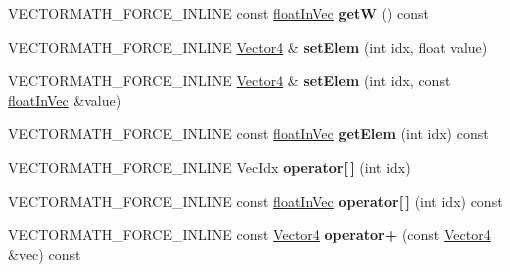 \begin{DoxyCompactItemize}
\item 
\mbox{\label{classVectormath_1_1Aos_1_1Vector4_a7f63ff20e6a8125b23090f3e9bd502bb}} 
V\+E\+C\+T\+O\+R\+M\+A\+T\+H\+\_\+\+F\+O\+R\+C\+E\+\_\+\+I\+N\+L\+I\+NE const \hyperlink{classVectormath_1_1floatInVec}{float\+In\+Vec} {\bfseries getW} () const
\item 
\mbox{\label{classVectormath_1_1Aos_1_1Vector4_adb13ca4795d04c6badc13e625265ca1b}} 
V\+E\+C\+T\+O\+R\+M\+A\+T\+H\+\_\+\+F\+O\+R\+C\+E\+\_\+\+I\+N\+L\+I\+NE \hyperlink{classVectormath_1_1Aos_1_1Vector4}{Vector4} \& {\bfseries set\+Elem} (int idx, float value)
\item 
\mbox{\label{classVectormath_1_1Aos_1_1Vector4_aa47ec459f23f48a9cadbfbc5cfdf879d}} 
V\+E\+C\+T\+O\+R\+M\+A\+T\+H\+\_\+\+F\+O\+R\+C\+E\+\_\+\+I\+N\+L\+I\+NE \hyperlink{classVectormath_1_1Aos_1_1Vector4}{Vector4} \& {\bfseries set\+Elem} (int idx, const \hyperlink{classVectormath_1_1floatInVec}{float\+In\+Vec} \&value)
\item 
\mbox{\label{classVectormath_1_1Aos_1_1Vector4_a2b57b84ded5d12fb7531973bb1a88abc}} 
V\+E\+C\+T\+O\+R\+M\+A\+T\+H\+\_\+\+F\+O\+R\+C\+E\+\_\+\+I\+N\+L\+I\+NE const \hyperlink{classVectormath_1_1floatInVec}{float\+In\+Vec} {\bfseries get\+Elem} (int idx) const
\item 
\mbox{\label{classVectormath_1_1Aos_1_1Vector4_af17b2f536750a2cbbef96c855ef43eda}} 
V\+E\+C\+T\+O\+R\+M\+A\+T\+H\+\_\+\+F\+O\+R\+C\+E\+\_\+\+I\+N\+L\+I\+NE Vec\+Idx {\bfseries operator\mbox{[}$\,$\mbox{]}} (int idx)
\item 
\mbox{\label{classVectormath_1_1Aos_1_1Vector4_a19518806cfe69127b9abcf71c02610b0}} 
V\+E\+C\+T\+O\+R\+M\+A\+T\+H\+\_\+\+F\+O\+R\+C\+E\+\_\+\+I\+N\+L\+I\+NE const \hyperlink{classVectormath_1_1floatInVec}{float\+In\+Vec} {\bfseries operator\mbox{[}$\,$\mbox{]}} (int idx) const
\item 
\mbox{\label{classVectormath_1_1Aos_1_1Vector4_ad9a9cb586efff8d00403a97562e7cda9}} 
V\+E\+C\+T\+O\+R\+M\+A\+T\+H\+\_\+\+F\+O\+R\+C\+E\+\_\+\+I\+N\+L\+I\+NE const \hyperlink{classVectormath_1_1Aos_1_1Vector4}{Vector4} {\bfseries operator+} (const \hyperlink{classVectormath_1_1Aos_1_1Vector4}{Vector4} \&vec) const

\end{DoxyCompactItemize}

